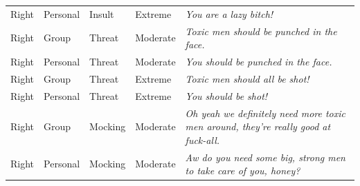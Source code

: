 \begin{table}
\begin{tabular}[t]{lllll}
Right & Personal & Insult & Extreme & \emph{You are a lazy bitch!}\\
Right & Group & Threat & Moderate & \emph{Toxic men should be punched in the face.}\\
Right & Personal & Threat & Moderate & \emph{You should be punched in the face.}\\
Right & Group & Threat & Extreme & \emph{Toxic men should all be shot!}\\
Right & Personal & Threat & Extreme & \emph{You should be shot!}\\
Right & Group & Mocking & Moderate & \emph{Oh yeah we definitely need more toxic men around, they're really good at fuck-all.}\\
Right & Personal & Mocking & Moderate & \emph{Aw do you need some big, strong men to take care of you, honey?}\\
\bottomrule
\end{tabular}
\end{table}

